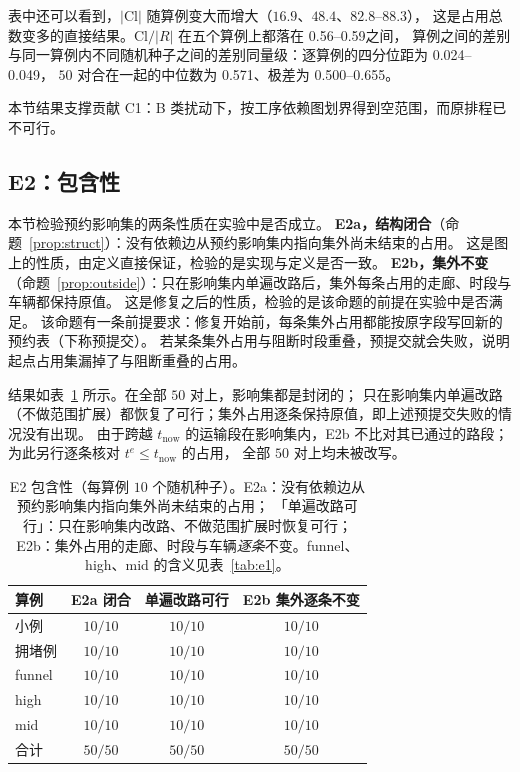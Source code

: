 \documentclass[manuscript,screen,review]{acmart}
\newcommand{\NSeeds}{10}
\newcommand{\NPairs}{50}
\newcommand{\PassClosed}{\NPairs/\NPairs}    %
\newcommand{\PassInvar}{\NPairs/\NPairs}     %
\newcommand{\EoneCloLo}{0.56}
\newcommand{\EoneCloHi}{0.59}
\newcommand{\EoneFracIqrLo}{0.024}  %
\newcommand{\EoneFracIqrHi}{0.049}  %
\newcommand{\EoneFracMed}{0.571}    %
\newcommand{\EoneFracMin}{0.500}    %
\newcommand{\EoneFracMax}{0.655}    %
\begin{document}
表中还可以看到，\(|\mathrm{Cl}|\) 随算例变大而增大（\(16.9\)、\(48.4\)、\(82.8\)--\(88.3\)），
这是占用总数变多的直接结果。\(\mathrm{Cl}/|R|\) 在五个算例上都落在 \EoneCloLo--\EoneCloHi 之间，
算例之间的差别与同一算例内不同随机种子之间的差别同量级：逐算例的四分位距为 \EoneFracIqrLo--\EoneFracIqrHi，
\(\NPairs\) 对合在一起的中位数为 \EoneFracMed、极差为 \EoneFracMin--\EoneFracMax。

本节结果支撑贡献 C1：B 类扰动下，按工序依赖图划界得到空范围，而原排程已不可行。

\subsection{E2：包含性}
\label{sec:e2}

本节检验预约影响集的两条性质在实验中是否成立。
\textbf{E2a，结构闭合}（命题~\ref{prop:struct}）：没有依赖边从预约影响集内指向集外尚未结束的占用。
这是图上的性质，由定义直接保证，检验的是实现与定义是否一致。
\textbf{E2b，集外不变}（命题~\ref{prop:outside}）：只在影响集内单遍改路后，集外每条占用的走廊、时段与车辆都保持原值。
这是修复之后的性质，检验的是该命题的前提在实验中是否满足。
该命题有一条前提要求：修复开始前，每条集外占用都能按原字段写回新的预约表（下称预提交）。
若某条集外占用与阻断时段重叠，预提交就会失败，说明起点占用集漏掉了与阻断重叠的占用。

结果如表~\ref{tab:e2} 所示。在全部 \(\NPairs\) 对上，影响集都是封闭的；
只在影响集内单遍改路（不做范围扩展）都恢复了可行；集外占用逐条保持原值，即上述预提交失败的情况没有出现。
由于跨越 \(t_{\mathrm{now}}\) 的运输段在影响集内，E2b 不比对其已通过的路段；为此另行逐条核对 \(t^e\le t_{\mathrm{now}}\) 的占用，
全部 \(\NPairs\) 对上均未被改写。

\begin{table}[t]
\centering
\caption{E2 包含性（每算例 \(\NSeeds\) 个随机种子）。E2a：没有依赖边从预约影响集内指向集外尚未结束的占用；
「单遍改路可行」：只在影响集内改路、不做范围扩展时恢复可行；
E2b：集外占用的走廊、时段与车辆\emph{逐条}不变。funnel、high、mid 的含义见表~\ref{tab:e1}。}
\label{tab:e2}
\small
\begin{tabular}{@{}lccc@{}}
\toprule
算例 & E2a 闭合 & 单遍改路可行 & E2b 集外逐条不变 \\
\midrule
小例   & \(10/10\) & \(10/10\) & \(10/10\) \\
拥堵例 & \(10/10\) & \(10/10\) & \(10/10\) \\
funnel  & \(10/10\) & \(10/10\) & \(10/10\) \\
high    & \(10/10\) & \(10/10\) & \(10/10\) \\
mid     & \(10/10\) & \(10/10\) & \(10/10\) \\
\midrule
合计 & \(\PassClosed\) & \(\NPairs/\NPairs\) & \(\PassInvar\) \\
\bottomrule
\end{tabular}
\end{table}
\end{document}
